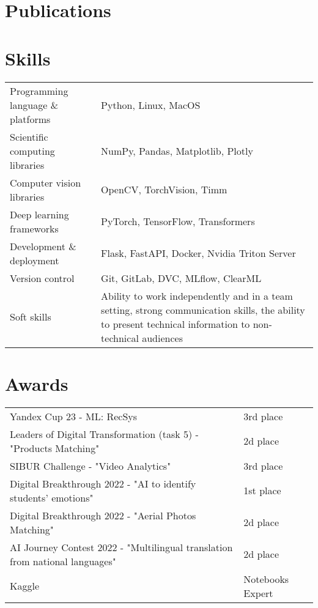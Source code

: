 \documentclass[a4paper,12pt]{article}
\begin{document}
\section{Publications}
\begin{refsection}
\nocite{*}
\printbibliography[heading=none]
\end{refsection}


\section{Skills}
\begin{tabularx}{\linewidth}{@{}l X@{}}
Programming language \& platforms &  \normalsize{Python, Linux, MacOS}\\
Scientific computing libraries &  \normalsize{NumPy, Pandas, Matplotlib, Plotly}\\  
Computer vision libraries &  \normalsize{OpenCV, TorchVision, Timm}\\  
Deep learning frameworks &  \normalsize{PyTorch, TensorFlow, Transformers}\\  
Development \& deployment &  \normalsize{Flask, FastAPI, Docker, Nvidia Triton Server}\\  
Version control &  \normalsize{Git, GitLab, DVC, MLflow, ClearML}\\ 
Soft skills & \normalsize{Ability to work independently and in a team setting, strong communication skills, the ability to present technical information to non-technical audiences}
\end{tabularx}

\section{Awards}
\begin{tabularx}{\linewidth}{@{}l X@{}}
Yandex Cup 23 - ML: RecSys &  \normalsize{3rd place}\\
Leaders of Digital Transformation (task 5) - "Products Matching" &  \normalsize{2d place}\\
SIBUR Challenge - "Video Analytics" &  \normalsize{3rd place}\\
Digital Breakthrough 2022 - "AI to identify students' emotions" &  \normalsize{1st place}\\
Digital Breakthrough 2022 - "Aerial Photos Matching" &  \normalsize{2d place }\\
AI Journey Contest 2022 - "Multilingual translation from national languages" & \normalsize{2d place} \\
Kaggle &  \normalsize{Notebooks Expert}
\end{tabularx}


\vfill
\end{document}
